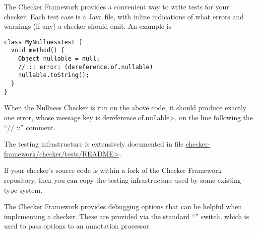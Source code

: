 
The Checker Framework provides a convenient way to write tests for your
checker.  Each test case is a Java file, with inline indications of what
errors and warnings (if any) a checker should emit.  An example is

\begin{Verbatim}
class MyNullnessTest {
  void method() {
    Object nullable = null;
    // :: error: (dereference.of.nullable)
    nullable.toString();
  }
}
\end{Verbatim}

\noindent
When the Nullness Checker is run on the above code, it should produce
exactly one error, whose message key is \<dereference.of.nullable>, on
the line following the ``// ::'' comment.

The testing infrastructure is extensively documented in file \href{https://github.com/typetools/checker-framework/blob/master/checker/tests/README}{\<checker-framework/checker/tests/README>}.

If your checker's source code is within a fork of the Checker Framework
repository, then you can copy the testing infrastructure used by some
existing type system.



The Checker Framework provides debugging options that can be helpful when
implementing a checker. These are provided via the standard  ``''
switch, which is used to pass options to an annotation processor.



